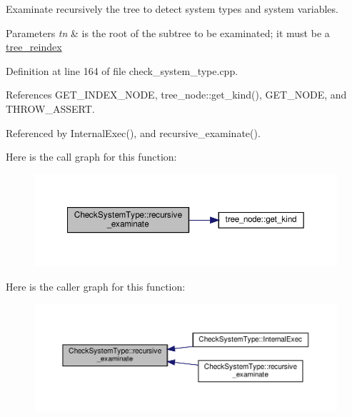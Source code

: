 Examinate recursively the tree to detect system types and system variables. 


\begin{DoxyParams}{Parameters}
{\em tn} & is the root of the subtree to be examinated; it must be a \hyperlink{classtree__reindex}{tree\+\_\+reindex} \\
\hline
\end{DoxyParams}


Definition at line 164 of file check\+\_\+system\+\_\+type.\+cpp.



References G\+E\+T\+\_\+\+I\+N\+D\+E\+X\+\_\+\+N\+O\+DE, tree\+\_\+node\+::get\+\_\+kind(), G\+E\+T\+\_\+\+N\+O\+DE, and T\+H\+R\+O\+W\+\_\+\+A\+S\+S\+E\+RT.



Referenced by Internal\+Exec(), and recursive\+\_\+examinate().

Here is the call graph for this function\+:
\nopagebreak
\begin{figure}[H]
\begin{center}
\leavevmode
\includegraphics[width=350pt]{d9/df6/classCheckSystemType_a63d20b2fc15355131c5860037581b037_cgraph}
\end{center}
\end{figure}
Here is the caller graph for this function\+:
\nopagebreak
\begin{figure}[H]
\begin{center}
\leavevmode
\includegraphics[width=350pt]{d9/df6/classCheckSystemType_a63d20b2fc15355131c5860037581b037_icgraph}
\end{center}
\end{figure}
\mbox{\label{classCheckSystemType_abf10add839bdbde290f74ecd7561392a}} 
